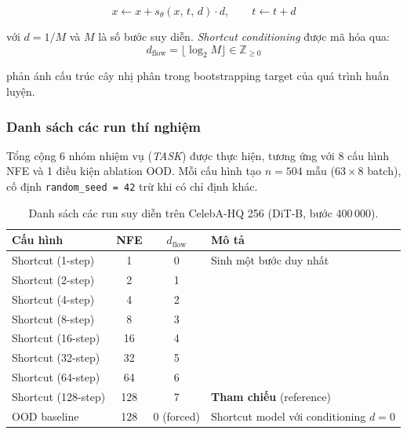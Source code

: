\begin{equation}
    x \leftarrow x + s_\theta(x,\, t,\, d)\cdot d, \qquad
    t \leftarrow t + d
    \label{eq:euler}
\end{equation}

\noindent với $d = 1/M$ và $M$ là số bước suy diễn. \textit{Shortcut conditioning} được mã hóa qua:
\begin{equation}
    d_{\mathrm{flow}} = \lfloor \log_2 M \rfloor \in \mathbb{Z}_{\geq 0}
    \label{eq:dtflow}
\end{equation}

\noindent phản ánh cấu trúc cây nhị phân trong bootstrapping target của quá trình huấn luyện.

\subsubsection{Danh sách các run thí nghiệm}

Tổng cộng 6 nhóm nhiệm vụ (\textit{TASK}) được thực hiện, tương ứng với 8 cấu hình NFE và 1 điều kiện ablation OOD. Mỗi cấu hình tạo $n = 504$ mẫu ($63 \times 8$ batch), cố định \texttt{random\_seed = 42} trừ khi có chỉ định khác.

\begin{table}[h]
\centering
\caption{Danh sách các run suy diễn trên CelebA-HQ 256 (DiT-B, bước 400\,000).}
\label{tab:runs}
\begin{tabular}{lccl}
\toprule
\textbf{Cấu hình} & \textbf{NFE} & $d_{\mathrm{flow}}$ & \textbf{Mô tả} \\
\midrule
Shortcut (1-step)   & 1   & 0 & Sinh một bước duy nhất \\
Shortcut (2-step)   & 2   & 1 & \\
Shortcut (4-step)   & 4   & 2 & \\
Shortcut (8-step)   & 8   & 3 & \\
Shortcut (16-step)  & 16  & 4 & \\
Shortcut (32-step)  & 32  & 5 & \\
Shortcut (64-step)  & 64  & 6 & \\
Shortcut (128-step) & 128 & 7 & \textbf{Tham chiếu} (reference) \\
OOD baseline        & 128 & 0 (forced) & Shortcut model với conditioning $d=0$ \\
\bottomrule
\end{tabular}
\end{table}

